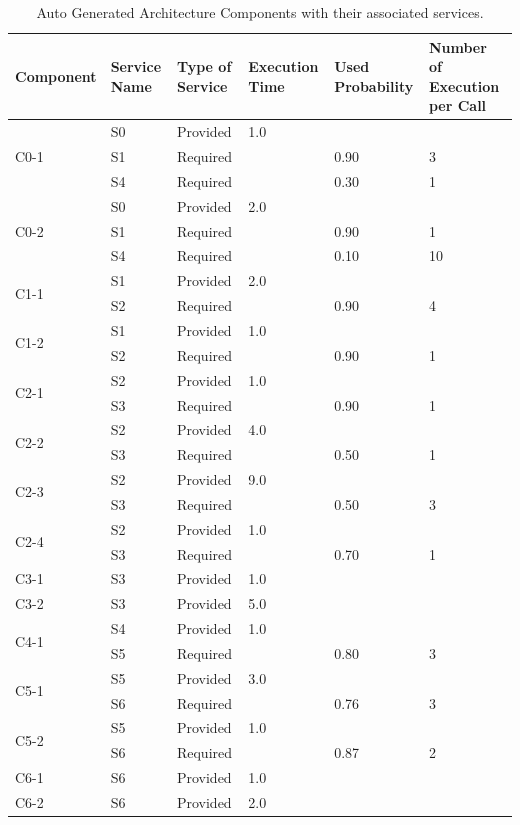 \begin{table}[ht!b]
	\centering
	\begin{tabular}{|p{2cm}|p{2.3cm}|p{1.4cm}|p{1.7cm}|p{1.5cm}|p{1.8cm}|}
		\hline 
		\textbf{Component} & \textbf{Service Name} & \textbf{Type of Service} & \textbf{Execution Time} & \textbf{Used Probability} & \textbf{Number of Execution per Call} \\ 
		\hline 
		\multirow{3}{*}{C0-1} & S0 & Provided & 1.0 & & \\\cline{2-6}
		& S1 & Required & & 0.90 & 3 \\
		& S4 & Required & & 0.30 & 1 \\
		\hline 
		\multirow{3}{*}{C0-2} & S0 & Provided & 2.0 & & \\\cline{2-6}
		& S1 & Required & & 0.90 & 1 \\
		& S4 & Required & & 0.10 & 10 \\
		\hline 
		\multirow{2}{*}{C1-1} & S1 & Provided & 2.0 & & \\\cline{2-6}
		& S2 & Required & & 0.90 & 4 \\
		\hline 
		\multirow{2}{*}{C1-2} & S1 & Provided & 1.0 & & \\\cline{2-6}
		& S2 & Required & & 0.90 & 1 \\
		\hline
		\multirow{2}{*}{C2-1} & S2 & Provided & 1.0 & & \\\cline{2-6}
		& S3 & Required & & 0.90 & 1 \\
		\hline
		\multirow{2}{*}{C2-2} & S2 & Provided & 4.0 & & \\\cline{2-6}
		& S3 & Required & & 0.50 & 1 \\
		\hline
		\multirow{2}{*}{C2-3} & S2 & Provided & 9.0 & & \\\cline{2-6}
		& S3 & Required & & 0.50 & 3 \\
		\hline
		\multirow{2}{*}{C2-4} & S2 & Provided & 1.0 & & \\\cline{2-6}
		& S3 & Required & & 0.70 & 1 \\
		\hline
		C3-1 & S3 & Provided & 1.0 & & \\
		\hline
		C3-2 & S3 & Provided & 5.0 & & \\
		\hline
		\multirow{2}{*}{C4-1} & S4 & Provided & 1.0 & & \\\cline{2-6}
		& S5 & Required & & 0.80 & 3 \\
		\hline
		\multirow{2}{*}{C5-1} & S5 & Provided & 3.0 & & \\\cline{2-6}
		& S6 & Required & & 0.76 & 3 \\
		\hline
		\multirow{2}{*}{C5-2} & S5 & Provided & 1.0 & & \\\cline{2-6}
		& S6 & Required & & 0.87 & 2 \\
		\hline
		C6-1 & S6 & Provided & 1.0 & & \\
		\hline
		C6-2 & S6 & Provided & 2.0 & & \\
		\hline
	\end{tabular} 
	\caption[Auto Generated Architecture Services]{Auto Generated Architecture Components with their associated services.}
	\label{tab:ag-serv}
\end{table}

